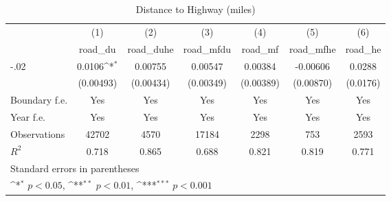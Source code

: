 \begin{table}[htbp]\centering
\def\sym#1{\ifmmode^{#1}\else\(^{#1}\)\fi}
\caption{Distance to Highway (miles)}
\begin{tabular}{l*{6}{c}}
\hline\hline
                    &\multicolumn{1}{c}{(1)}&\multicolumn{1}{c}{(2)}&\multicolumn{1}{c}{(3)}&\multicolumn{1}{c}{(4)}&\multicolumn{1}{c}{(5)}&\multicolumn{1}{c}{(6)}\\
                    &\multicolumn{1}{c}{road\_du}&\multicolumn{1}{c}{road\_duhe}&\multicolumn{1}{c}{road\_mfdu}&\multicolumn{1}{c}{road\_mf}&\multicolumn{1}{c}{road\_mfhe}&\multicolumn{1}{c}{road\_he}\\
\hline
-.02                &      0.0106\sym{*}  &     0.00755         &     0.00547         &     0.00384         &    -0.00606         &      0.0288         \\
                    &   (0.00493)         &   (0.00434)         &   (0.00349)         &   (0.00389)         &   (0.00870)         &    (0.0176)         \\
[1em]
Boundary f.e.       &         Yes         &         Yes         &         Yes         &         Yes         &         Yes         &         Yes         \\
[1em]
Year f.e.           &         Yes         &         Yes         &         Yes         &         Yes         &         Yes         &         Yes         \\
\hline
Observations        &       42702         &        4570         &       17184         &        2298         &         753         &        2593         \\
\(R^{2}\)           &       0.718         &       0.865         &       0.688         &       0.821         &       0.819         &       0.771         \\
\hline\hline
\multicolumn{7}{l}{\footnotesize Standard errors in parentheses}\\
\multicolumn{7}{l}{\footnotesize \sym{*} \(p<0.05\), \sym{**} \(p<0.01\), \sym{***} \(p<0.001\)}\\
\end{tabular}
\end{table}
